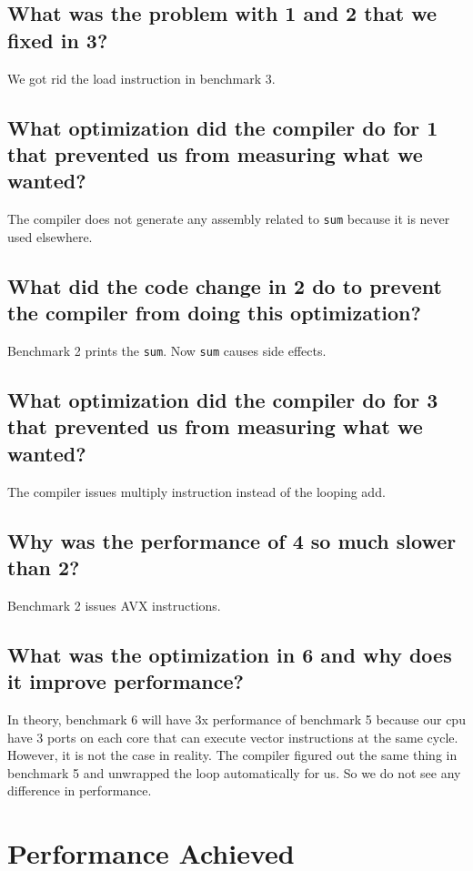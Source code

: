 \documentclass{article}
\begin{document}
\subsection{What was the problem with 1 and 2 that we fixed in 3?}
We got rid the load instruction in benchmark 3.

\subsection{What optimization did the compiler do for 1 that prevented
  us from measuring what we wanted?}
The compiler does not generate any assembly related to \verb|sum| because
it is never used elsewhere.

\subsection{What did the code change in 2 do to prevent the compiler
  from doing this optimization?}
Benchmark 2 prints the \verb|sum|. Now \verb|sum| causes side effects.

\subsection{What optimization did the compiler do for 3 that prevented
  us from measuring what we wanted?}
The compiler issues multiply instruction instead of the looping add.

\subsection{Why was the performance of 4 so much slower than 2?}
Benchmark 2 issues AVX instructions.

\subsection{What was the optimization in 6 and why does it improve
  performance?}
In theory, benchmark 6 will have 3x performance of benchmark 5 because
our cpu have 3 ports on each core that can execute vector instructions
at the same cycle. However, it is not the case in reality. The
compiler figured out the same thing in benchmark 5 and unwrapped the
loop automatically for us. So we do not see any difference in
performance.

\section{Performance Achieved}
\end{document}
